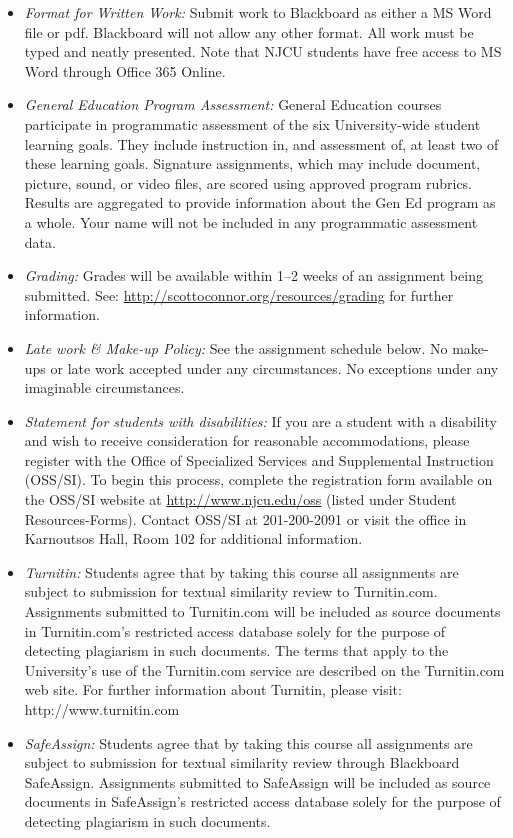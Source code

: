 \documentclass[article,oneside]{memoir}
\begin{document}
\begin{itemize}
\item \textit{Format for Written Work:} Submit work to Blackboard as either a MS Word file or pdf. Blackboard will not allow any other format. All work must be typed and neatly presented. Note that NJCU students have free access to MS Word through Office 365 Online.


\item \textit{General Education Program Assessment:} General Education courses participate in programmatic assessment of the six University-wide student learning goals. They include instruction in, and assessment of, at least two of these learning goals. Signature assignments, which may include document, picture, sound, or video files, are scored using approved program rubrics. Results are aggregated to provide information about the Gen Ed program as a whole. Your name will not be included in any programmatic assessment data.

\item \textit{Grading:} Grades will be available within 1--2 weeks of an assignment being submitted. See: \href{http://scottoconnor.org/resources/grading}{http://scottoconnor.org/resources/grading} for further information.


\item \textit{Late work \& Make-up Policy:} See the assignment schedule below. No make-ups or late work accepted under any circumstances. No exceptions under any imaginable circumstances.

\item \textit{Statement for students with disabilities:} If you are a student with a disability and wish to receive consideration for reasonable accommodations, please register with the Office of Specialized Services and Supplemental Instruction (OSS/SI). To begin this process, complete the registration form available on the OSS/SI website at \href{http://www.njcu.edu/oss}{http://www.njcu.edu/oss} (listed under Student Resources-Forms). Contact OSS/SI at 201-200-2091 or visit the office in Karnoutsos Hall, Room 102 for additional information.

\item \textit{Turnitin:} Students agree that by taking this course all assignments are subject to submission for textual similarity review to Turnitin.com. Assignments submitted to Turnitin.com will be included as source documents in Turnitin.com's restricted access database solely for the purpose of detecting plagiarism in such documents.  The terms that apply to the University’s use of the Turnitin.com service are described on the Turnitin.com web site.  For further information about Turnitin, please visit: http://www.turnitin.com 

\item \textit{SafeAssign:} Students agree that by taking this course all assignments are subject to submission for textual similarity review through Blackboard SafeAssign. Assignments submitted to SafeAssign will be included as source documents in SafeAssign's restricted access database solely for the purpose of detecting plagiarism in such documents.  


\end{itemize}
\end{document}
